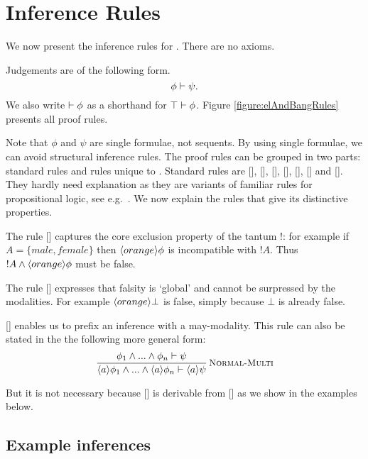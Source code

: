 \section{Inference Rules}\label{elAndBangMore}



\NI We now present the inference rules for \cathoristic{}. There are no
axioms.

\begin{definition} Judgements are of the following form.
\[
  \phi \vdash \psi.
\]
We also write $\vdash \phi$ as a shorthand for $\top \vdash
\phi$. Figure \ref{figure:elAndBangRules}
presents all proof rules.
\end{definition}

\NI Note that $\phi$ and $\psi$ are single formulae, not sequents.  By
using single formulae, we can avoid structural inference rules.  The
proof rules can be grouped in two parts: standard rules and rules
unique to \cathoristic{}.  Standard rules are [],
[], [],
[], [],
[] and []. They hardly need
explanation as they are variants of familiar rules for propositional
logic, see e.g.~\cite{TroelstraAS:basprot,vanDalenD:logstr}.  We now
explain the rules that give \cathoristic{} its distinctive properties.

The rule []  captures the core
exclusion property of the tantum !: for example if $A = \{male, female\}$
then $\langle orange \rangle \phi$ is incompatible with $!A$. Thus $!A \land
\langle orange \rangle \phi$ must be false.

The rule [] expresses that falsity is `global'
  and cannot be surpressed by the modalities. For example
  $\langle orange \rangle \bot$ is false, simply because $\bot$ is already
  false.

[] enables us to prefix an inference with a
may-modality.  This rule can also be stated in the the following more
general form:
\[
   \frac{\displaystyle{ 
     \phi_1\land...\land\phi_n \vdash\psi
    }}{\displaystyle{ 
     \langle a \rangle \phi_1\land...\land\langle a \rangle \phi_n \vdash\langle a \rangle \psi
    }}\,\textsc{\small Normal-Multi}
\]

\NI But it is not necessary because [] is
derivable from [] as we show in the examples below.

\subsection{Example inferences}

